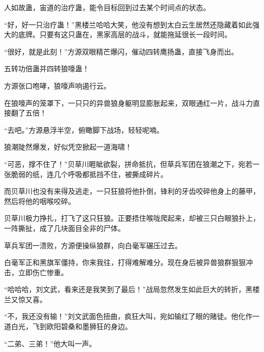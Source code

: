 \begin{this_body}
人如故蛊，宙道的治疗蛊，能令目标回到过去某个时间点的状态。

“好，好一只治疗蛊！”黑楼兰哈哈大笑，他没有想到太白云生居然还隐藏着如此强大的底牌。只要有这只蛊在，黑家高层的战斗，就能拖延很长一段时间。

“很好，就是此刻！”方源双眼精芒爆闪，催动四转鹰扬蛊，直接飞身而出。

五转功倍蛊并四转狼嚎蛊！

方源张口咆哮，狼嚎声响遏行云。

在狼嚎声的笼罩下，一只只的异兽狼身躯明显膨胀起来，双眼通红一片，战斗力直接翻了五倍！

“去吧。”方源悬浮半空，俯瞰脚下战场，轻轻呢喃。

狼潮陡然爆发，好似凭空掀起一道海啸！

“可恶，撑不住了！”贝草川睚眦欲裂，拼命抵抗，但草兵军团在狼潮之下，宛若一张脆弱的纸，连几个呼吸都抵挡不住，被撕成碎片。

而贝草川也没有来得及逃走，一只狂狼将他扑倒，锋利的牙齿咬碎他身上的藤甲，然后将他的咽喉咬碎。

贝草川极力挣扎，打飞了这只狂狼。正要捂住喉咙爬起来，却被三只白眼狼扑上，一阵撕扯，成了几块面目全非的尸体。

草兵军团一溃败，方源便操纵狼群，向白毫军碾压过去。

白毫军正和黑旗军僵持，你来我往，打得难解难分。现在身后被异兽狼群狠狠冲击，立即伤亡惨重。

“哈哈哈，刘文武，看来还是我笑到了最后！”战局忽然发生如此巨大的转折，黑楼兰又惊又喜。

“不，我还没有输！”刘文武面色扭曲，疯狂大叫，宛如输红了眼的赌徒。他化作一道白光，飞到欧阳碧桑和墨狮狂的身边。

“二弟、三弟！”他大叫一声。

\end{this_body}


